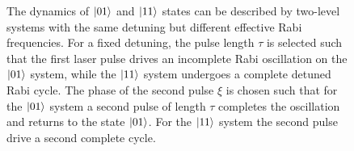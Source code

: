 \documentclass[rmp,10pt,onecolumn,fleqn,notitlepage]{revtex4-1}
\begin{document}
    \begin{figure}[h!]
    \begin{minipage}[c]{0.49\linewidth}
    \centering
    \end{minipage}
    \begin{minipage}[]{0.49\linewidth}
    \centering
    \end{minipage}
    \caption{The dynamics of $\left\vert{01}\right\rangle$ and $\left\vert{11}\right\rangle$ states can be described by two-level systems with the same detuning but different effective Rabi frequencies. For a fixed detuning, the pulse length $\tau$ is selected such that the first laser pulse drives an incomplete Rabi oscillation on the $\left\vert{01}\right\rangle$ system, while the $\left\vert{11}\right\rangle$ system undergoes a complete detuned Rabi cycle. The phase of the second pulse $\xi$ is chosen such that for the $\left\vert{01}\right\rangle$ system a second pulse of length $\tau$ completes the oscillation and returns to the state $\left\vert{01}\right\rangle$. For the $\left\vert{11}\right\rangle$ system the second pulse drive a second complete cycle.}
    \label{fig:dynamics}
    \end{figure}

\clearpage
\end{document}
